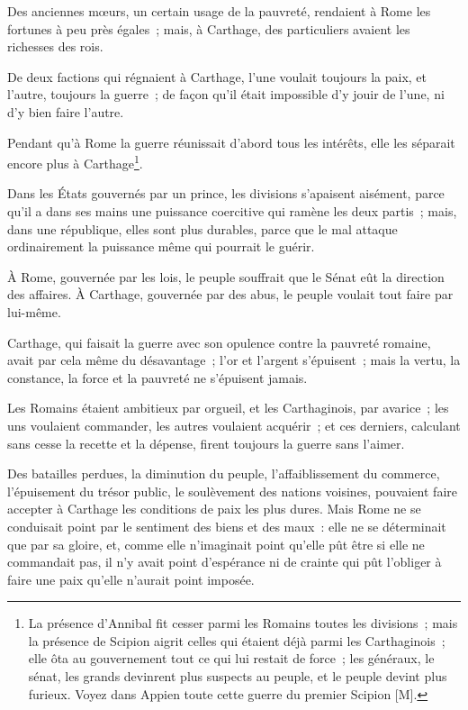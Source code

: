 \documentclass[french,twoside]{book} %
\begin{document}
Des anciennes mœurs, un certain usage de la pauvreté, rendaient à Rome les fortunes à peu près égales ; mais, à Carthage, des particuliers avaient les richesses des rois.\par
De deux factions qui régnaient à Carthage, l’une voulait toujours la paix, et l’autre, toujours la guerre ; de façon qu’il était impossible d’y jouir de l’une, ni d’y bien faire l’autre.\par
Pendant qu’à Rome la guerre réunissait d’abord tous les intérêts, elle les séparait encore plus à Carthage\footnote{La présence d’Annibal fit cesser parmi les Romains toutes les divisions ; mais la présence de Scipion aigrit celles qui étaient déjà parmi les Carthaginois ; elle ôta au gouvernement tout ce qui lui restait de force ; les généraux, le sénat, les grands devinrent plus suspects au peuple, et le peuple devint plus furieux. Voyez dans Appien toute cette guerre du premier Scipion [M].}.\par
Dans les États gouvernés par un prince, les divisions s’apaisent aisément, parce qu’il a dans ses mains une puissance coercitive qui ramène les deux partis ; mais, dans une république, elles sont plus durables, parce que le mal attaque ordinairement la puissance même qui pourrait le guérir.\par
À Rome, gouvernée par les lois, le peuple souffrait que le Sénat eût la direction des affaires. À Carthage, gouvernée par des abus, le peuple voulait tout faire par lui-même.\par
Carthage, qui faisait la guerre avec son opulence contre la pauvreté romaine, avait par cela même du désavantage ; l’or et l’argent s’épuisent ; mais la vertu, la constance, la force et la pauvreté ne s’épuisent jamais.\par
Les Romains étaient ambitieux par orgueil, et les Carthaginois, par avarice ; les uns voulaient commander, les autres voulaient acquérir ; et ces derniers, calculant sans cesse la recette et la dépense, firent toujours la guerre sans l’aimer.\par
Des batailles perdues, la diminution du peuple, l’affaiblissement du commerce, l’épuisement du trésor public, le soulèvement des nations voisines, pouvaient faire accepter à Carthage les conditions de paix les plus dures. Mais Rome ne se conduisait point par le sentiment des biens et des maux : elle ne se déterminait que par sa gloire, et, comme elle n’imaginait point qu’elle pût être si elle ne commandait pas, il n’y avait point d’espérance ni de crainte qui pût l’obliger à faire une paix qu’elle n’aurait point imposée.\par
\end{document}

